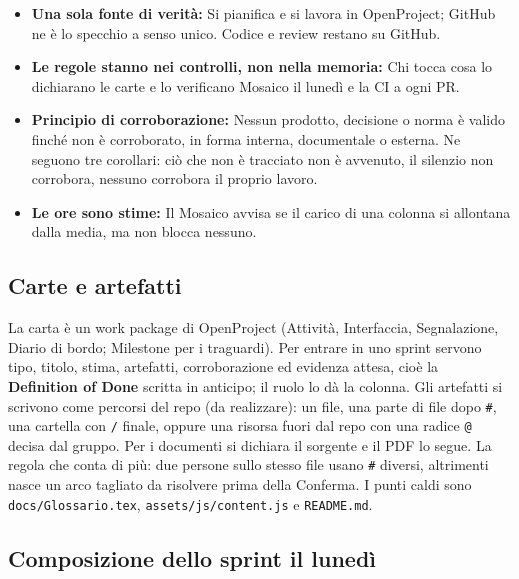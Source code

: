 \documentclass[a4paper, 11pt]{article}
\begin{document}
\begin{itemize}
  \item \textbf{Una sola fonte di verit\`a:} Si pianifica e si lavora in OpenProject; GitHub ne \`e lo specchio a senso unico. Codice e review restano su GitHub.
  \item \textbf{Le regole stanno nei controlli, non nella memoria:} Chi tocca cosa lo dichiarano le carte e lo verificano Mosaico il luned\`i e la CI a ogni PR.
  \item \textbf{Principio di corroborazione:} Nessun prodotto, decisione o norma \`e valido finch\'e non \`e corroborato, in forma interna, documentale o esterna. Ne seguono tre corollari: ci\`o che non \`e tracciato non \`e avvenuto, il silenzio non corrobora, nessuno corrobora il proprio lavoro.
  \item \textbf{Le ore sono stime:} Il Mosaico avvisa se il carico di una colonna si allontana dalla media, ma non blocca nessuno.
\end{itemize}

\subsection{Carte e artefatti}

La carta \`e un work package di OpenProject (Attivit\`a, Interfaccia, Segnalazione, Diario di bordo; Milestone per i traguardi). \newline Per entrare in uno sprint servono tipo, titolo, stima, artefatti, corroborazione ed evidenza attesa, cio\`e la \textbf{Definition of Done} scritta in anticipo; il ruolo lo d\`a la colonna.
\newline \newline
Gli artefatti si scrivono come percorsi del repo (da realizzare): un file, una parte di file dopo \texttt{\#}, una cartella con \texttt{/} finale, oppure una risorsa fuori dal repo con una radice \texttt{@} decisa dal gruppo. Per i documenti si dichiara il sorgente e il PDF lo segue. La regola che conta di pi\`u: due persone sullo stesso file usano \texttt{\#} diversi, altrimenti nasce un arco tagliato da risolvere prima della Conferma. I punti caldi sono \texttt{docs/Glossario.tex}, \texttt{assets/js/content.js} e \texttt{README.md}.

\subsection{Composizione dello sprint il luned\`i}
\end{document}
